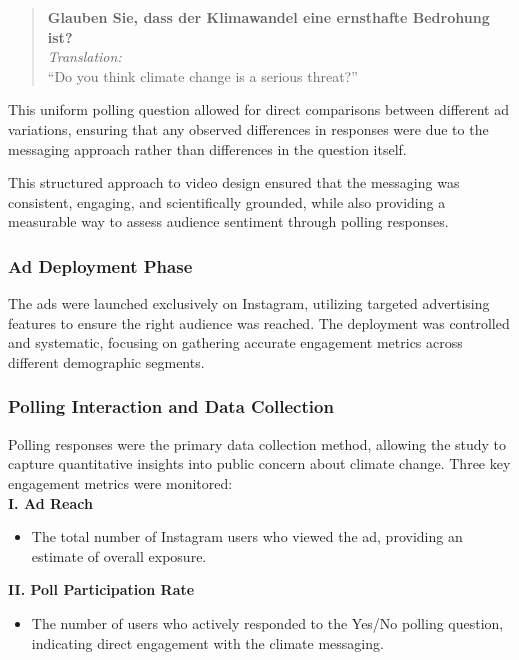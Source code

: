 \documentclass[a4paper,11pt]{article}
\begin{document}
\begin{quote}
    \textbf{Glauben Sie, dass der Klimawandel eine ernsthafte Bedrohung ist?} \\
    \textit{Translation:} \\
    “Do you think climate change is a serious threat?”
\end{quote}

This uniform polling question allowed for direct comparisons between different ad variations, ensuring that any observed differences in responses were due to the messaging approach rather than differences in the question itself.

This structured approach to video design ensured that the messaging was consistent, engaging, and scientifically grounded, while also providing a measurable way to assess audience sentiment through polling responses.

\subsubsection{Ad Deployment Phase}
The ads were launched exclusively on Instagram, utilizing targeted advertising features to ensure the right audience was reached. The deployment was controlled and systematic, focusing on gathering accurate engagement metrics across different demographic segments.

\subsubsection{Polling Interaction and Data Collection}
Polling responses were the primary data collection method, allowing the study to capture quantitative insights into public concern about climate change. Three key engagement metrics were monitored:\\

\noindent \textbf{I. Ad Reach}
\begin{itemize}
    \item The total number of Instagram users who viewed the ad, providing an estimate of overall exposure.
\end{itemize}

\noindent \textbf{II. Poll Participation Rate}
\begin{itemize}
    \item The number of users who actively responded to the Yes/No polling question, indicating direct engagement with the climate messaging.
\end{itemize}
\end{document}
